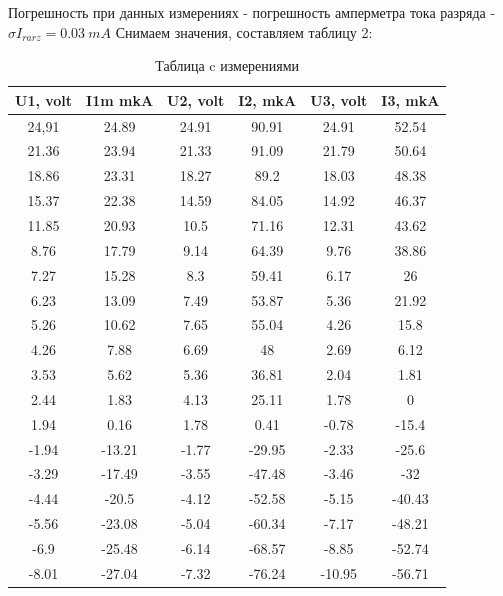 Погрешность при данных измерениях - погрешность амперметра тока разряда - $\sigma{I_{rarz}} = 0.03 \: mA$
Снимаем значения, составляем таблицу 2:


\begin{table}[!]
\caption{Таблица c измерениями}
    \begin{center}
        \begin{tabular}{| c | c | c | c | c | c |}
        \hline
        \textbf{U1, volt} & \textbf{I1m mkA} & \textbf{U2, volt} & \textbf{I2, mkA} & \textbf{U3, volt} & \textbf{I3, mkA} \\
        \hline
        24,91 & 24.89 &   24.91   & 90.91 & 24.91 & 52.54\\
        \hline
        21.36 & 23.94 & 21.33 & 91.09 & 21.79 & 50.64\\
        \hline
        18.86 & 23.31 & 18.27 & 89.2 & 18.03 & 48.38\\
        \hline
        15.37 & 22.38 & 14.59 & 84.05 & 14.92 & 46.37\\
        \hline
        11.85 & 20.93 & 10.5 & 71.16 & 12.31 & 43.62\\
        \hline
        8.76 & 17.79 & 9.14 & 64.39 & 9.76 & 38.86\\
        \hline
        7.27 & 15.28 & 8.3 & 59.41 & 6.17 & 26\\
        \hline
        6.23 & 13.09 & 7.49 & 53.87 & 5.36 & 21.92\\
        \hline
        5.26 & 10.62 & 7.65 & 55.04 & 4.26 & 15.8\\
        \hline
        4.26 & 7.88 & 6.69 & 48 & 2.69 & 6.12\\
        \hline
        3.53 & 5.62 & 5.36 & 36.81 & 2.04 & 1.81\\
        \hline
        2.44 & 1.83 & 4.13 & 25.11 & 1.78 & 0\\
        \hline
        1.94 & 0.16 & 1.78 & 0.41 & -0.78 & -15.4\\
        \hline
        -1.94 & -13.21 & -1.77 & -29.95 & -2.33 & -25.6\\
        \hline
        -3.29 & -17.49 & -3.55 & -47.48 & -3.46 & -32\\
        \hline
        -4.44 & -20.5 & -4.12 & -52.58 & -5.15 & -40.43\\
        \hline
        -5.56 & -23.08 & -5.04 & -60.34 & -7.17 & -48.21\\
        \hline
        -6.9 & -25.48 & -6.14 & -68.57 & -8.85 & -52.74\\
        \hline
        -8.01 & -27.04 & -7.32 & -76.24 & -10.95 & -56.71\\

\end{tabular}
\end{center}
\end{table}
